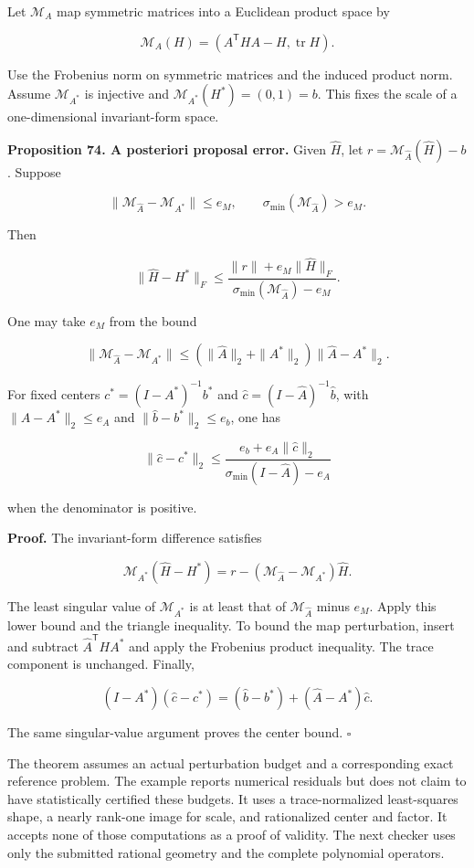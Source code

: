 \documentclass[11pt,letterpaper]{article}
\begin{document}
Let \(\mathcal M_A\) map symmetric matrices into a Euclidean product
space by

\[
\mathcal M_A(H)=(A^{\mathsf T}HA-H,\operatorname{tr}H).
\]

Use the Frobenius norm on symmetric matrices and the induced product
norm. Assume \(\mathcal M_{A^*}\) is injective and
\(\mathcal M_{A^*}(H^*)=(0,1)=b\). This fixes the scale of a
one-dimensional invariant-form space.

\textbf{Proposition 74. A posteriori proposal error.} Given
\(\widehat H\), let \(r=\mathcal M_{\widehat A}(\widehat H)-b\). Suppose

\[
\|\mathcal M_{\widehat A}-\mathcal M_{A^*}\|\leq e_M,
\qquad \sigma_{\min}(\mathcal M_{\widehat A})>e_M.
\]

Then

\[
\boxed{
\|\widehat H-H^*\|_F
\leq
\frac{\|r\|+e_M\|\widehat H\|_F}
{\sigma_{\min}(\mathcal M_{\widehat A})-e_M}.
}
\]

One may take \(e_M\) from the bound

\[
\|\mathcal M_{\widehat A}-\mathcal M_{A^*}\|\leq(\|\widehat A\|_2+\|A^*\|_2)\|\widehat A-A^*\|_2.
\]

For fixed centers \(c^*=(I-A^*)^{-1}b^*\) and
\(\widehat c=(I-\widehat A)^{-1}\widehat b\), with
\(\|\widehat A-A^*\|_2\leq e_A\) and \(\|\widehat b-b^*\|_2\leq e_b\),
one has

\[
\|\widehat c-c^*\|_2
\leq\frac{e_b+e_A\|\widehat c\|_2}
{\sigma_{\min}(I-\widehat A)-e_A}
\]

when the denominator is positive.

\textbf{Proof.} The invariant-form difference satisfies

\[
\mathcal M_{A^*}(\widehat H-H^*)
=r-(\mathcal M_{\widehat A}-\mathcal M_{A^*})\widehat H.
\]

The least singular value of \(\mathcal M_{A^*}\) is at least that of
\(\mathcal M_{\widehat A}\) minus \(e_M\). Apply this lower bound and
the triangle inequality. To bound the map perturbation, insert and
subtract \(\widehat A^{\mathsf T}HA^*\) and apply the Frobenius product
inequality. The trace component is unchanged. Finally,

\[
(I-A^*)(\widehat c-c^*)=(\widehat b-b^*)+(\widehat A-A^*)\widehat c.
\]

The same singular-value argument proves the center bound. \(\square\)

The theorem assumes an actual perturbation budget and a corresponding
exact reference problem. The example reports numerical residuals but
does not claim to have statistically certified these budgets. It uses a
trace-normalized least-squares shape, a nearly rank-one image for scale,
and rationalized center and factor. It accepts none of those
computations as a proof of validity. The next checker uses only the
submitted rational geometry and the complete polynomial operators.
\end{document}
